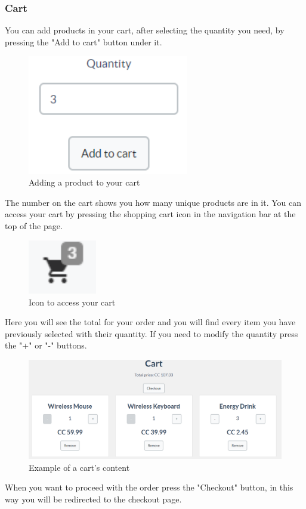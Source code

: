 		\subsubsection{Cart}
		You can add products in your cart, after selecting the quantity you 
		need, by pressing the "Add to cart" button under it.
		\begin{figure}[H]
			\includegraphics[width=7cm]{res/images/add_to_cart.png}
			\centering
			\caption{Adding a product to your cart}
		\end{figure}
		\noindent The number on the cart shows you how many unique products 
		are in it. You can access your cart by pressing the shopping cart icon 
		in the navigation bar at the top of the page.
		\begin{figure}[H]
			\includegraphics[width=3cm]{res/images/cart_icon.png}
			\centering
			\caption{Icon to access your cart}
		\end{figure}
		\noindent Here you will see the total for your order and you will find 
		every item you have previously selected with their quantity. If you 
		need to modify the quantity press the "+" or "-" buttons.
		\begin{figure}[H]
			\includegraphics[width=15cm]{res/images/cart_example.png}
			\centering
			\caption{Example of a cart's content}
		\end{figure}
		\noindent When you want to proceed with the order press the "Checkout" 
		button, in this way you will be redirected to the checkout page.
